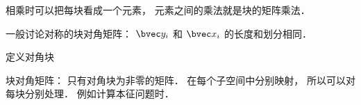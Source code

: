 
\begin{issues}
\issueDraft
\end{issues}

相乘时可以把每块看成一个元素， 元素之间的乘法就是块的矩阵乘法．

一般讨论对称的块对角矩阵： $\bvec y_i$ 和 $\bvec x_i$ 的长度和划分相同．

定义对角块

块对角矩阵： 只有对角块为非零的矩阵． 在每个子空间中分别映射， 所以可以对每块分别处理． 例如计算本征问题时．
